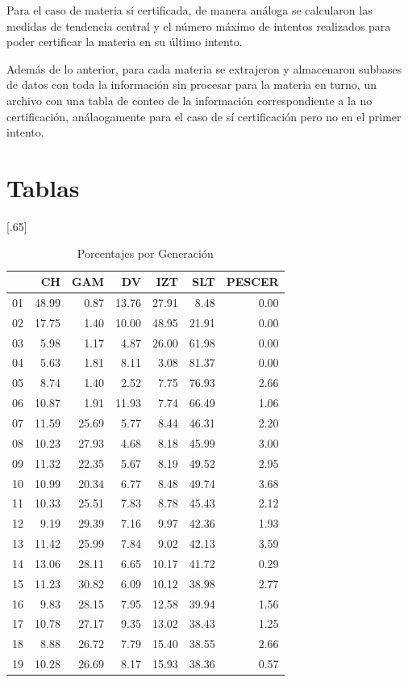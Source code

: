 \documentclass[12pt]{article}
\begin{document}
Para el caso de materia s\'i certificada, de manera an\'aloga se calcularon las medidas de tendencia central y el n\'umero m\'aximo de intentos realizados para poder certificar la materia en su \'ultimo intento. 

Adem\'as de lo anterior, para cada materia se extrajeron y almacenaron subbases de datos con toda la informaci\'on sin procesar para la materia en turno, un archivo con una tabla de conteo de la informaci\'on correspondiente a la no certificaci\'on, an\'alaogamente para el caso de s\'i certificaci\'on pero no en el primer intento. 


\section{Tablas}



\begin{table}[ht]
\centering
\caption{\small{Porcentajes por Generación}}
\scalebox{0.65}[.65]{
\begin{tabular}{r|rrrrrr}
  \hline
 & CH & GAM & DV & IZT & SLT & PESCER \\ 
  \hline
01 & 48.99 & 0.87 & 13.76 & 27.91 & 8.48 & 0.00 \\ 
  02 & 17.75 & 1.40 & 10.00 & 48.95 & 21.91 & 0.00 \\ 
  03 & 5.98 & 1.17 & 4.87 & 26.00 & 61.98 & 0.00 \\ 
  04 & 5.63 & 1.81 & 8.11 & 3.08 & 81.37 & 0.00 \\ 
  05 & 8.74 & 1.40 & 2.52 & 7.75 & 76.93 & 2.66 \\ 
  06 & 10.87 & 1.91 & 11.93 & 7.74 & 66.49 & 1.06 \\ 
  07 & 11.59 & 25.69 & 5.77 & 8.44 & 46.31 & 2.20 \\ 
  08 & 10.23 & 27.93 & 4.68 & 8.18 & 45.99 & 3.00 \\ 
  09 & 11.32 & 22.35 & 5.67 & 8.19 & 49.52 & 2.95 \\ 
  10 & 10.99 & 20.34 & 6.77 & 8.48 & 49.74 & 3.68 \\ 
  11 & 10.33 & 25.51 & 7.83 & 8.78 & 45.43 & 2.12 \\ 
  12 & 9.19 & 29.39 & 7.16 & 9.97 & 42.36 & 1.93 \\ 
  13 & 11.42 & 25.99 & 7.84 & 9.02 & 42.13 & 3.59 \\ 
  14 & 13.06 & 28.11 & 6.65 & 10.17 & 41.72 & 0.29 \\ 
  15 & 11.23 & 30.82 & 6.09 & 10.12 & 38.98 & 2.77 \\ 
  16 & 9.83 & 28.15 & 7.95 & 12.58 & 39.94 & 1.56 \\ 
  17 & 10.78 & 27.17 & 9.35 & 13.02 & 38.43 & 1.25 \\ 
  18 & 8.88 & 26.72 & 7.79 & 15.40 & 38.55 & 2.66 \\ 
  19 & 10.28 & 26.69 & 8.17 & 15.93 & 38.36 & 0.57 \\ 
   \hline
\end{tabular}}
\end{table}
\end{document}
